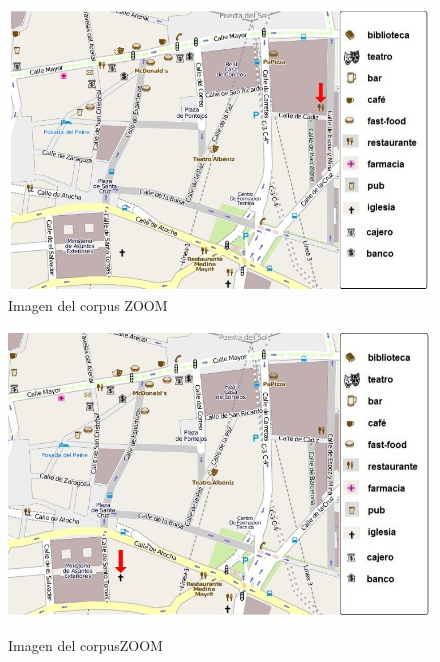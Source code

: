 \begin{figure}
\begin{minipage}[b]{0.5\linewidth}
\centering
\includegraphics[width=\textwidth]{images/corpus/mapa5.png}\\[0pt]
\caption{Imagen del corpus ZOOM}
\label{mapa5}
\end{minipage}
\hspace*{0cm}
\begin{minipage}[b]{0.5\linewidth}
\centering
\includegraphics[width=\textwidth]{images/corpus/mapa6.png}\\[0pt]
\caption{Imagen del corpusZOOM}
\label{mapa6}
\end{minipage}
\end{figure}

